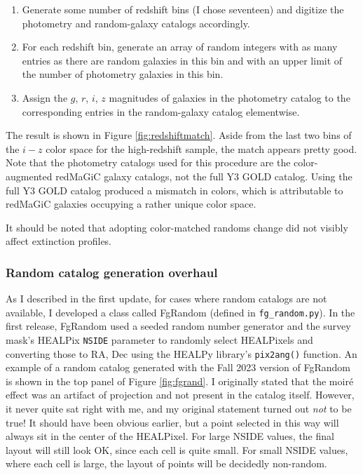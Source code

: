 \documentclass[11pt, oneside]{article}   	%
\begin{document}
\begin{enumerate}
\item Generate some number of redshift bins (I chose seventeen) and digitize the photometry and random-galaxy catalogs accordingly. 
\item For each redshift bin, generate an array of random integers with as many entries as there are random galaxies in this bin and with an upper limit of the number of photometry galaxies in this bin. 
\item Assign the $g$, $r$, $i$, $z$ magnitudes of galaxies in the photometry catalog to the corresponding entries in the random-galaxy catalog elementwise.
\end{enumerate}

The result is shown in Figure \ref{fig:redshiftmatch}. Aside from the last two bins of the $i-z$ color space for the high-redshift sample, the match appears pretty good.  Note that the photometry catalogs used for this procedure are the color-augmented redMaGiC galaxy catalogs, not the full Y3 GOLD catalog. Using the full Y3 GOLD catalog produced a mismatch in colors, which is attributable to redMaGiC galaxies occupying a rather unique color space. 

It should be noted that adopting color-matched randoms change did not visibly affect extinction profiles.  



\subsubsection{Random catalog generation overhaul}\label{sec:code:randoms}

As I described in the first update, for cases where random catalogs are not available, I developed a class called FgRandom (defined in \texttt{fg\_random.py}). In the first release, FgRandom used a seeded random number generator and the survey mask's HEALPix \texttt{NSIDE} parameter to randomly select HEALPixels and converting those to RA, Dec using the HEALPy library's \texttt{pix2ang()} function. An example of a random catalog generated with the Fall 2023 version of FgRandom is shown in the top panel of Figure \ref{fig:fgrand}. I originally stated that the moir\'{e} effect was an artifact of projection and not present in the catalog itself. However, it never quite sat right with me, and my original statement turned out \textit{not} to be true! It should have been obvious earlier, but a point selected in this way will always sit in the center of the HEALPixel. For large NSIDE values, the final layout will still look OK, since each cell is quite small. For small NSIDE values, where each cell is large, the layout of points will be decidedly non-random. 
\end{document}
